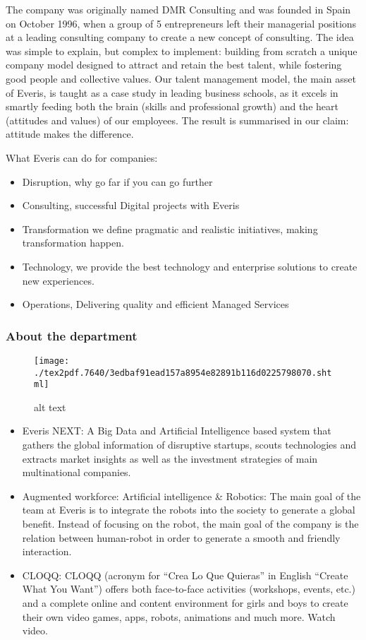 \documentclass[]{article}
\begin{document}
The company was originally named DMR Consulting and was founded in Spain
on October 1996, when a group of 5 entrepreneurs left their managerial
positions at a leading consulting company to create a new concept of
consulting. The idea was simple to explain, but complex to implement:
building from scratch a unique company model designed to attract and
retain the best talent, while fostering good people and collective
values. Our talent management model, the main asset of Everis, is taught
as a case study in leading business schools, as it excels in smartly
feeding both the brain (skills and professional growth) and the heart
(attitudes and values) of our employees. The result is summarised in our
claim: attitude makes the difference.

What Everis can do for companies:

\begin{itemize}
\item
  Disruption, why go far if you can go further
\item
  Consulting, successful Digital projects with Everis
\item
  Transformation we define pragmatic and realistic initiatives, making
  transformation happen.
\item
  Technology, we provide the best technology and enterprise solutions to
  create new experiences.
\item
  Operations, Delivering quality and efficient Managed Services
\end{itemize}

\hypertarget{about-the-department}{%
\subsubsection{About the department}\label{about-the-department}}

\begin{figure}
\centering
\texttt{[image: ./tex2pdf.7640/3edbaf91ead157a8954e82891b116d0225798070.shtml]}
\caption{alt text}
\end{figure}

\begin{itemize}
\item
  Everis NEXT: A Big Data and Artificial Intelligence based system that
  gathers the global information of disruptive startups, scouts
  technologies and extracts market insights as well as the investment
  strategies of main multinational companies.
\item
  Augmented workforce: Artificial intelligence \& Robotics: The main
  goal of the team at Everis is to integrate the robots into the society
  to generate a global benefit. Instead of focusing on the robot, the
  main goal of the company is the relation between human-robot in order
  to generate a smooth and friendly interaction.
\item
  CLOQQ: CLOQQ (acronym for ``Crea Lo Que Quieras'' in English ``Create
  What You Want'') offers both face-to-face activities (workshops,
  events, etc.) and a complete online and content environment for girls
  and boys to create their own video games, apps, robots, animations and
  much more. Watch video.
\end{itemize}
\end{document}
